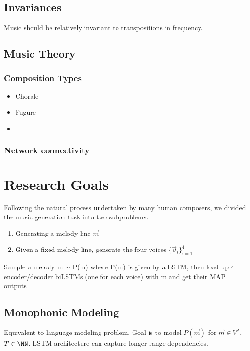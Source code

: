 \documentclass[a4paper,oneside,reqno,onecolumn]{amsart}
\begin{document}
\subsection{Invariances}

Music should be relatively invariant to transpositions in frequency.

\subsection{Music Theory}

\subsubsection{Composition Types}

\begin{itemize}
    \item Chorale
    \item Fugure
    \item {}
\end{itemize}

\subsubsection{Network connectivity}

\section{Research Goals}

Following the natural process undertaken by many human composers, we divided
the music generation task into two subproblems:
\begin{enumerate}
    \item Generating a melody line $\vec{m}$
    \item Given a fixed melody line, generate the four voices $\{\vec{v}_i\}_{i=1}^4$
\end{enumerate}

Sample a melody m $\sim$ P(m) where P(m) is given by a LSTM, then load up 4
encoder/decoder biLSTMs (one for each voice) with m and get their MAP outputs

\subsection{Monophonic Modeling}

Equivalent to language modeling problem. Goal is to model $P(\vec{m})$ for $\vec{m}
\in V^T$, $T \in \NN$. LSTM architecture can capture longer range dependencies.
\end{document}
